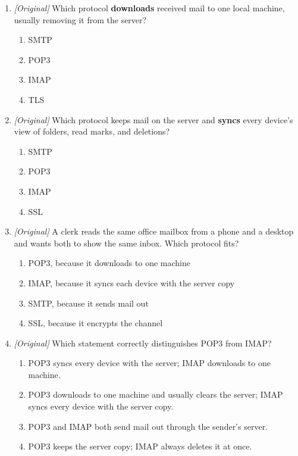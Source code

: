 \documentclass[11pt]{article}
\begin{document}
\begin{enumerate}[label=\textbf{Q\arabic*.}, leftmargin=*]
\begin{enumerate}[label=\Alph*.]
    \item SSL
  \end{enumerate}
\item \textit{[Original]} Which protocol \textbf{downloads} received mail to
  one local machine, usually removing it from the server?
  \begin{enumerate}[label=\Alph*.]
    \item SMTP
    \item POP3
    \item IMAP
    \item TLS
  \end{enumerate}
\item \textit{[Original]} Which protocol keeps mail on the server and
  \textbf{syncs} every device's view of folders, read marks, and deletions?
  \begin{enumerate}[label=\Alph*.]
    \item SMTP
    \item POP3
    \item IMAP
    \item SSL
  \end{enumerate}
\item \textit{[Original]} A clerk reads the same office mailbox from a phone
  and a desktop and wants both to show the same inbox. Which protocol fits?
  \begin{enumerate}[label=\Alph*.]
    \item POP3, because it downloads to one machine
    \item IMAP, because it syncs each device with the server copy
    \item SMTP, because it sends mail out
    \item SSL, because it encrypts the channel
  \end{enumerate}
\item \textit{[Original]} Which statement correctly distinguishes POP3 from
  IMAP?
  \begin{enumerate}[label=\Alph*.]
    \item POP3 syncs every device with the server; IMAP downloads to one machine.
    \item POP3 downloads to one machine and usually clears the server; IMAP syncs every device with the server copy.
    \item POP3 and IMAP both send mail out through the sender's server.
    \item POP3 keeps the server copy; IMAP always deletes it at once.
  \end{enumerate}

\end{enumerate}
\end{document}
